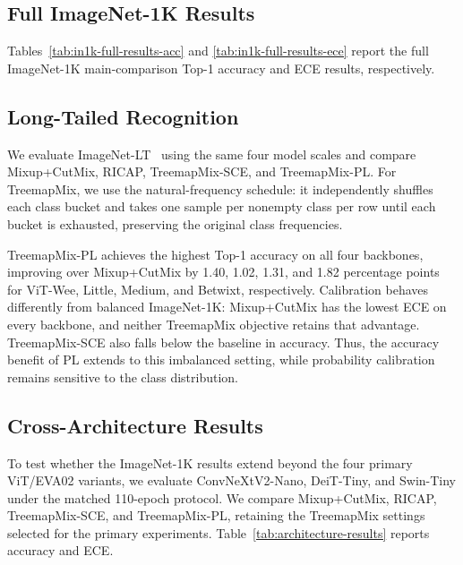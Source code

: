 \subsection{Full ImageNet-1K Results}
\label{app:in1k-confidence-results}

Tables~\ref{tab:in1k-full-results-acc} and
\ref{tab:in1k-full-results-ece} report the full ImageNet-1K
main-comparison Top-1 accuracy and ECE results, respectively.





\subsection{Long-Tailed Recognition}
\label{app:long-tail-results}

We evaluate ImageNet-LT~\citep{tang2020longtailed} using the same four model
scales and compare Mixup+CutMix, RICAP, TreemapMix-SCE, and TreemapMix-PL.
For TreemapMix, we use the natural-frequency schedule: it independently
shuffles each class bucket and takes one sample per nonempty class per row
until each bucket is exhausted, preserving the original class frequencies.

TreemapMix-PL achieves the highest Top-1 accuracy on all four backbones,
improving over Mixup+CutMix by 1.40, 1.02, 1.31, and 1.82 percentage points
for ViT-Wee, Little, Medium, and Betwixt, respectively. Calibration behaves
differently from balanced ImageNet-1K: Mixup+CutMix has the lowest ECE on
every backbone, and neither TreemapMix objective retains that advantage.
TreemapMix-SCE also falls below the baseline in accuracy. Thus, the accuracy
benefit of PL extends to this imbalanced setting, while probability
calibration remains sensitive to the class distribution.



\subsection{Cross-Architecture Results}
\label{app:architecture-results}
To test whether the ImageNet-1K results extend beyond the four primary
ViT/EVA02 variants, we evaluate ConvNeXtV2-Nano, DeiT-Tiny, and Swin-Tiny
under the matched 110-epoch protocol.
We compare Mixup+CutMix, RICAP, TreemapMix-SCE, and TreemapMix-PL, retaining
the TreemapMix settings selected for the primary experiments.
Table~\ref{tab:architecture-results} reports accuracy and ECE.

